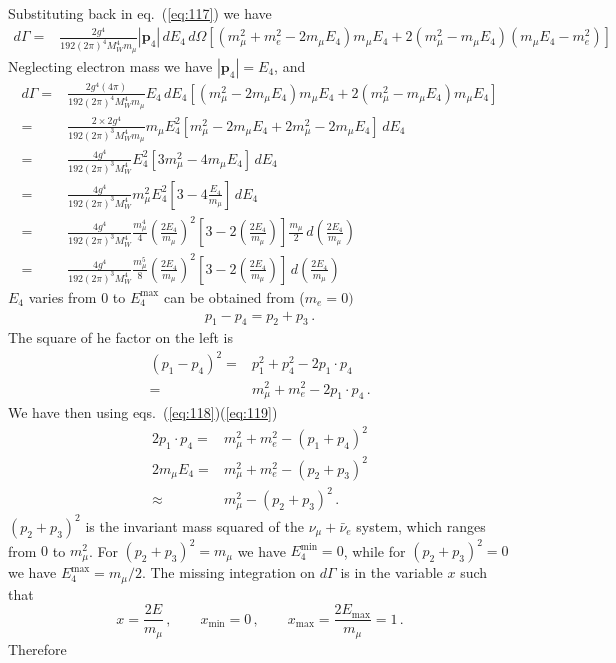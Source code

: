 Substituting back in eq.~(\ref{eq:117}) we have 
\begin{align}
  d\Gamma=&\frac{2g^4}{192 (2\pi)^4 M_W^4 m_\mu }|\mathbf{p}_4|\,d E_4\,d\Omega[(m_\mu^2+m_e^2-2m_\mu E_4)m_\mu E_4 
  +2(m_\mu^2-m_\mu E_4)(m_\mu E_4-m_e^2)]
\end{align}
Neglecting electron mass we have $|\mathbf{p}_4| = E_4$, and
\begin{align}
   d\Gamma=&\frac{2g^4(4\pi)}{192 (2\pi)^4 M_W^4 m_\mu }E_4\,d E_4[(m_\mu^2-2m_\mu E_4)m_\mu E_4 
  +2(m_\mu^2-m_\mu E_4)m_\mu E_4]\nonumber\\
  =&\frac{2\times2g^4}{192 (2\pi)^3 M_W^4 m_\mu }m_\mu E_4^2[m_\mu^2-2m_\mu E_4
  +2m_\mu^2-2m_\mu E_4]\,d E_4\nonumber\\
  =&\frac{4g^4}{192 (2\pi)^3 M_W^4 }E_4^2\left[3m_\mu^2-4m_\mu E_4\right]\,d E_4\nonumber\\
  =&\frac{4g^4}{192 (2\pi)^3 M_W^4 }m_\mu^2E_4^2\left[3-4\frac{E_4}{m_\mu}\right]\,d E_4\nonumber\\
  =&\frac{4g^4}{192 (2\pi)^3 M_W^4 }\frac{m_\mu^4}{4}\left(\frac{2E_4}{m_\mu}\right)^2
  \left[3-2\left(\frac{2E_4}{m_\mu}\right)\right]\frac{m_\mu}{2}\,d \left(\frac{2E_4}{m_\mu}\right)\nonumber\\
 =&\frac{4g^4}{192 (2\pi)^3 M_W^4 }\frac{m_\mu^5}{8}\left(\frac{2E_4}{m_\mu}\right)^2
  \left[3-2\left(\frac{2E_4}{m_\mu}\right)\right]\,d \left(\frac{2E_4}{m_\mu}\right)
\end{align}
$E_4$ varies from 0 to $E_4^{\text{max}}$ can be obtained from ($m_e=0)$
\begin{align}
  \label{eq:119}
p_1-p_4=p_2+p_3\,.
\end{align}
The square of he factor on the left is
\begin{align}
  (p_1-p_4)^2=&p_1^2+p_4^2-2p_1\cdot p_4\nonumber\\
  =&m_\mu^2+m_e^2-2p_1\cdot p_4\,.
\end{align}
We have then using eqs.~(\ref{eq:118})(\ref{eq:119})
\begin{align}
  2p_1\cdot p_4=&m_\mu^2+m_e^2-(p_1+p_4)^2\nonumber\\
  2m_\mu E_4=&m_\mu^2+m_e^2-(p_2+p_3)^2\nonumber\\
  \approx&m_\mu^2-(p_2+p_3)^2\,.
\end{align}
$(p_2+p_3)^2$ is the invariant mass squared of the $\nu_\mu+\bar{\nu}_e$ system, which ranges from $0$ to $m_\mu^2$. For $(p_2+p_3)^2=m_\mu$ we have $E_4^{\text{min}}=0$, while for $(p_2+p_3)^2=0$ we have $E_4^{\text{max}}=m_\mu/2$. The missing integration on $d\Gamma$ is in the variable $x$ such that
\begin{equation}
  x=\frac{2E}{m_\mu}\,,\qquad x_{\text{min}}=0\,,\qquad x_{\text{max}}=\frac{2E_{\text{max}}}{m_\mu}=1\,.
\end{equation}
Therefore

